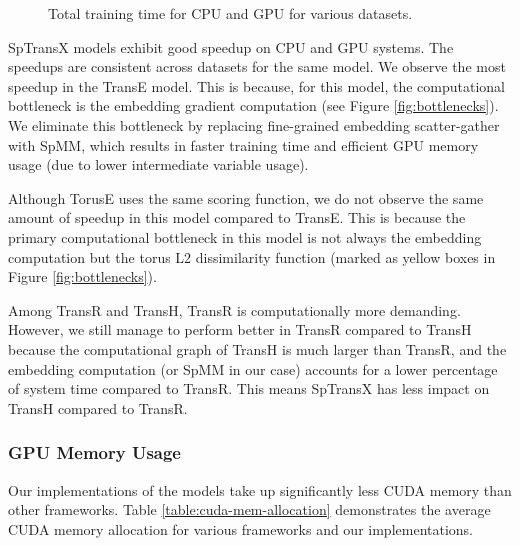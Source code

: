 \begin{figure*}[btp]
\centering     %
{}
\caption{Total training time for CPU and GPU for various datasets. }
\label{fig:total_trg_time}
\end{figure*}

    SpTransX models exhibit good speedup on CPU and GPU systems. The speedups are consistent across datasets for the same model. We observe the most speedup in the TransE model. This is because, for this model, the computational bottleneck is the embedding gradient computation (see Figure \ref{fig:bottlenecks}). We eliminate this bottleneck by replacing fine-grained embedding scatter-gather with SpMM, which results in faster training time and efficient GPU memory usage (due to lower intermediate variable usage).
    
    Although TorusE uses the same scoring function, we do not observe the same amount of speedup in this model compared to TransE. This is because the primary computational bottleneck in this model is not always the embedding computation but the torus L2 dissimilarity function (marked as yellow boxes in Figure \ref{fig:bottlenecks}). 
    
    Among TransR and TransH, TransR is computationally more demanding. However, we still manage to perform better in TransR compared to TransH because the computational graph of TransH is much larger than TransR, and the embedding computation (or SpMM in our case) accounts for a lower percentage of system time compared to TransR. This means SpTransX has less impact on TransH compared to TransR.
    
    \subsubsection{GPU Memory Usage}
    Our implementations of the models take up significantly less CUDA memory than other frameworks. Table \ref{table:cuda-mem-allocation} demonstrates the average CUDA memory allocation for various frameworks and our implementations.


